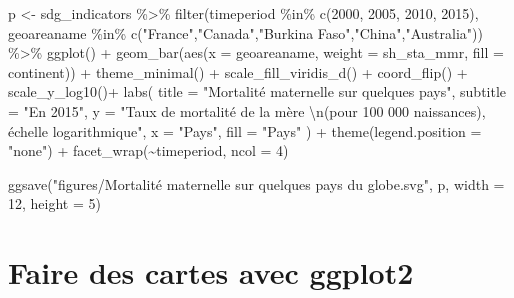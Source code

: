 \documentclass[
]{book}
\newenvironment{Shaded}{\begin{snugshade}}{\end{snugshade}}
\newcommand{\AttributeTok}[1]{\textcolor[rgb]{0.77,0.63,0.00}{#1}}
\newcommand{\DecValTok}[1]{\textcolor[rgb]{0.00,0.00,0.81}{#1}}
\newcommand{\FunctionTok}[1]{\textcolor[rgb]{0.00,0.00,0.00}{#1}}
\newcommand{\NormalTok}[1]{#1}
\newcommand{\OtherTok}[1]{\textcolor[rgb]{0.56,0.35,0.01}{#1}}
\newcommand{\SpecialCharTok}[1]{\textcolor[rgb]{0.00,0.00,0.00}{#1}}
\newcommand{\StringTok}[1]{\textcolor[rgb]{0.31,0.60,0.02}{#1}}
\begin{document}
\begin{Shaded}
\begin{Highlighting}[]
\NormalTok{p }\OtherTok{\textless{}{-}}\NormalTok{ sdg\_indicators }\SpecialCharTok{\%\textgreater{}\%} 
  \FunctionTok{filter}\NormalTok{(timeperiod  }\SpecialCharTok{\%in\%} \FunctionTok{c}\NormalTok{(}\DecValTok{2000}\NormalTok{, }\DecValTok{2005}\NormalTok{, }\DecValTok{2010}\NormalTok{, }\DecValTok{2015}\NormalTok{),}
\NormalTok{         geoareaname }\SpecialCharTok{\%in\%} \FunctionTok{c}\NormalTok{(}\StringTok{"France"}\NormalTok{,}\StringTok{"Canada"}\NormalTok{,}\StringTok{"Burkina Faso"}\NormalTok{,}\StringTok{"China"}\NormalTok{,}\StringTok{"Australia"}\NormalTok{)) }\SpecialCharTok{\%\textgreater{}\%}
  \FunctionTok{ggplot}\NormalTok{() }\SpecialCharTok{+}
  \FunctionTok{geom\_bar}\NormalTok{(}\FunctionTok{aes}\NormalTok{(}\AttributeTok{x =}\NormalTok{ geoareaname, }\AttributeTok{weight =}\NormalTok{ sh\_sta\_mmr, }\AttributeTok{fill =}\NormalTok{ continent)) }\SpecialCharTok{+}
  \FunctionTok{theme\_minimal}\NormalTok{() }\SpecialCharTok{+}
  \FunctionTok{scale\_fill\_viridis\_d}\NormalTok{() }\SpecialCharTok{+}
  \FunctionTok{coord\_flip}\NormalTok{() }\SpecialCharTok{+}
  \FunctionTok{scale\_y\_log10}\NormalTok{()}\SpecialCharTok{+}
  \FunctionTok{labs}\NormalTok{(}
    \AttributeTok{title =} \StringTok{"Mortalité maternelle sur quelques pays"}\NormalTok{,}
    \AttributeTok{subtitle =} \StringTok{"En 2015"}\NormalTok{,}
    \AttributeTok{y =} \StringTok{"Taux de mortalité de la mère }\SpecialCharTok{\textbackslash{}n}\StringTok{(pour 100 000 naissances), échelle logarithmique"}\NormalTok{,}
    \AttributeTok{x =} \StringTok{"Pays"}\NormalTok{,}
    \AttributeTok{fill =} \StringTok{"Pays"}
\NormalTok{  ) }\SpecialCharTok{+}
  \FunctionTok{theme}\NormalTok{(}\AttributeTok{legend.position =} \StringTok{"none"}\NormalTok{) }\SpecialCharTok{+}
  \FunctionTok{facet\_wrap}\NormalTok{(}\SpecialCharTok{\textasciitilde{}}\NormalTok{timeperiod, }\AttributeTok{ncol =} \DecValTok{4}\NormalTok{)}

\FunctionTok{ggsave}\NormalTok{(}\StringTok{"figures/Mortalité maternelle sur quelques pays du globe.svg"}\NormalTok{, p, }\AttributeTok{width =} \DecValTok{12}\NormalTok{, }\AttributeTok{height =} \DecValTok{5}\NormalTok{)}
\end{Highlighting}
\end{Shaded}

\hypertarget{faire-des-cartes-avec-ggplot2}{%
\section{Faire des cartes avec ggplot2}\label{faire-des-cartes-avec-ggplot2}}
\end{document}
